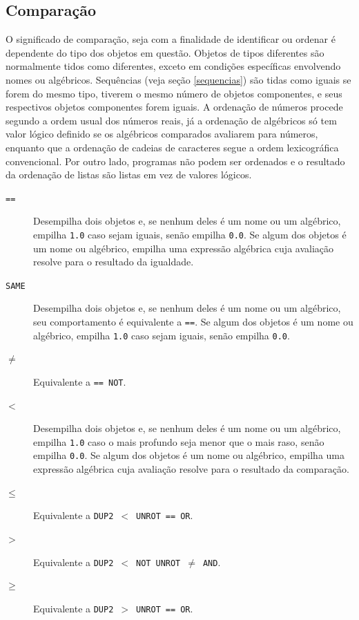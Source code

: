 \documentclass[12pt,a4paper]{report}
\newcommand{\kwd}[1]{\texttt{\textcolor{keyword}{#1}}}
\newcommand{\UNROT}{\kwd{UNROT}}   %
\newcommand{\DUPTWO}{\kwd{DUP2}}   %
\newcommand{\NOT}{\kwd{NOT}}   %
\newcommand{\AND}{\kwd{AND}}   %
\newcommand{\OR}{\kwd{OR}}   %
\newcommand{\SAME}{\kwd{SAME}}   %
\newcommand{\EQEQ}{\kwd{==}}   %
\newcommand{\LESS}{\kwd{$<$}}   %
\newcommand{\LEQ}{\kwd{$\leq$}}   %
\newcommand{\GREATER}{\kwd{$>$}}   %
\newcommand{\GEQ}{\kwd{$\geq$}}   %
\newcommand{\DIFF}{\kwd{$\neq$}} %
\numberwithin{theorem}{chapter}
\begin{document}
\subsection{Comparação}

O significado de comparação, seja com a finalidade de identificar ou
ordenar é dependente do tipo dos objetos em questão.  Objetos de tipos
diferentes são normalmente tidos como diferentes, exceto em condições
específicas envolvendo nomes ou algébricos.  Sequências (veja seção
\ref{sequencias}) são tidas como iguais se forem do mesmo tipo,
tiverem o mesmo número de objetos componentes, e seus respectivos
objetos componentes forem iguais.  A ordenação de números procede
segundo a ordem usual dos números reais, já a ordenação de algébricos
só tem valor lógico definido se os algébricos comparados avaliarem
para números, enquanto que a ordenação de cadeias de caracteres segue
a ordem lexicográfica convencional.  Por outro lado, programas não
podem ser ordenados e o resultado da ordenação de listas são listas em
vez de valores lógicos.

\begin{description}

\item[\EQEQ]\label{EQEQ} Desempilha dois objetos e, se nenhum deles é
  um nome ou um algébrico, empilha \texttt{1.0} caso sejam iguais, senão
  empilha \texttt{0.0}.  Se algum dos objetos é um nome ou algébrico,
  empilha uma expressão algébrica cuja avaliação resolve para o
  resultado da igualdade.

\item[\SAME]\label{SAME} Desempilha dois objetos e, se nenhum deles é
  um nome ou um algébrico, seu comportamento é equivalente a \EQEQ.
  Se algum dos objetos é um nome ou algébrico, empilha \texttt{1.0} caso
  sejam iguais, senão empilha \texttt{0.0}.

\item[\DIFF]\label{DIF} Equivalente a \EQEQ\ \NOT.

\item[\LESS]\label{LESS} Desempilha dois objetos e, se nenhum deles é
  um nome ou um algébrico, empilha \texttt{1.0} caso o mais profundo
  seja menor que o mais raso, senão empilha \texttt{0.0}.  Se algum dos
  objetos é um nome ou algébrico, empilha uma expressão algébrica cuja
  avaliação resolve para o resultado da comparação.

\item[\LEQ]\label{LEQ} Equivalente a
  \DUPTWO\ \LESS\ \UNROT\ \EQEQ\ \OR.

\item[\GREATER]\label{GREATER} Equivalente a
  \DUPTWO\ \LESS\ \NOT\ \UNROT\ \DIFF\ \AND.

\item[\GEQ]\label{GEQ} Equivalente a
  \DUPTWO\ \GREATER\ \UNROT\ \EQEQ\ \OR.

\end{description}
\end{document}
